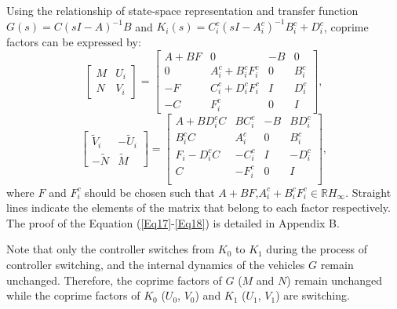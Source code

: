 \documentclass[journal]{IEEEtran}
\begin{document}
Using the relationship of state-space representation and transfer function $G(s)=C(sI-A)^{-1} B$ and $K_i (s)=C_i^c (sI-A_i^c)^{-1} B_i^c+D_i^c$, coprime factors can be expressed by:
\begin{equation}
  \left[\begin{array}{cc}
      M & U_{i} \\
      N & V_{i}
    \end{array}\right]=\left[\begin{array}{cc|cc}
      A+B F     & 0                             & -B & 0         \\
      0         & A_{i}^{c}+B_{i}^{c} F_{i}^{c} & 0  & B_{i}^{c} \\
      \hline -F & C_{i}^{c}+D_{i}^{c} F_{i}^{c} & I  & D_{i}^{c} \\
      -C        & F_{i}^{c}                     & 0  & I
    \end{array}\right],
  \label{Eq17}
\end{equation}
\begin{equation}
  \left[\begin{array}{cc}
      \tilde{V}_{i} & -\tilde{U}_{i} \\
      -\tilde{N}    & \tilde{M}
    \end{array}\right]=\left[\begin{array}{cc|cc}
      A+B  D_{i}^{c} C          & B  C_{i}^{c} & -B & B  D_{i}^{c} \\
      B_{i}^{c} C               & A_{i}^{c}    & 0  & B_{i}^{c}    \\
      \hline F_{i}- D_{i}^{c} C & -C_{i}^{c}   & I  & -D_{i}^{c}   \\
      C                         & -F_{i}^{c}   & 0  & I            \\
    \end{array}\right],
  \label{Eq18}
\end{equation}
where $F$ and $F_i^c$ should be chosen such that $A+BF$,$A_i^c+B_i^c F_i^c\in \mathbb{R} H_{\infty}$. Straight lines indicate the elements of the matrix that belong to each factor respectively. The proof of the Equation (\ref{Eq17}-\ref{Eq18}) is detailed in Appendix B.

Note that only the controller switches from $K_0$ to $K_1$ during the process of controller switching, and the internal dynamics of the vehicles $G$ remain unchanged. Therefore, the coprime factors of $G$ ($M$ and $N$) remain unchanged while the coprime factors of $K_0$ ($U_0$, $V_0$) and $K_1$ ($U_1$, $V_1$) are switching.
\end{document}
